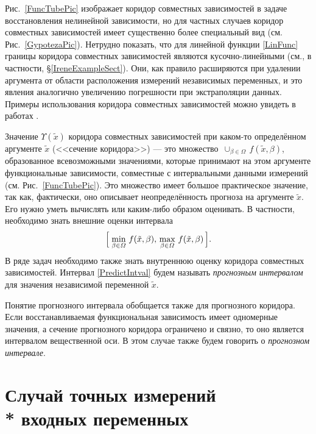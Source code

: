 \documentclass[a5paper,openany]{book}
\begin{document}
Рис.~\ref{FuncTubePic} изображает коридор совместных зависимостей в задаче 
восстановления нелинейной зависимости, но для частных случаев коридор совместных 
зависимостей имеет существенно более специальный вид (см.  Рис.~\ref{GypotezaPic}). 
Нетрудно показать, что для линейной функции \eqref{LinFunc} границы коридора 
совместных зависимостей являются кусочно-линейными (см., в частности, 
\S\ref{IreneExampleSect}). Они, как правило расширяются при удалении аргумента 
от области расположения измерений независимых переменных, и это явления аналогично 
увеличению погрешности при экстраполяции данных. Примеры использования коридора 
совместных зависимостей можно увидеть в работах \cite{Kumkov2010,KumkovIgnatenkova}. 
      
Значение $\varUpsilon(\tilde{x})$ коридора совместных зависимостей при каком-то 
определённом аргументе $\tilde{x}$ (<<сечение коридора>>) --- это множество 
$\,\cup_{\beta\in\varOmega}\, f(\tilde{x},\beta)$, образованное всевозможными 
значениями, которые принимают на этом аргументе функциональные зависимости, 
совместные с интервальными данными измерений (см. Рис.~\ref{FuncTubePic}). 
Это множество имеет большое практическое значение, так как, фактически, оно 
описывает неопределённость прогноза на аргументе $\tilde{x}$. Его нужно уметь 
вычислять или каким-либо образом оценивать. В частности, необходимо знать 
внешние оценки интервала 
\begin{equation} 
\label{PredictIntval} 
\Bigl[\;\min_{\beta\in\varOmega}\, f(\tilde{x},\beta),\,  
   \max_{\beta\in\varOmega}\, f(\tilde{x},\beta)\,\Bigr].   
\end{equation} 
В ряде задач необходимо также знать внутреннюю оценку коридора совместных 
зависимостей. Интервал \eqref{PredictIntval} будем называть \emph{прогнозным 
интервалом} для значения независимой переменной $\tilde{x}$.  
  
Понятие прогнозного интервала обобщается также для прогнозного коридора.  
Если восстанавливаемая функциональная зависимость имеет одномерные значения, 
а сечение прогнозного коридора ограничено и связно, то оно является интервалом 
вещественной оси. В этом случае также будем говорить о \emph{прогнозном интервале}. 
    
        
  
\section[Случай точных измерений входных переменных]%
        {Случай точных измерений \\* входных переменных} 
\label{ExactInputSect} 
  
\end{document}
